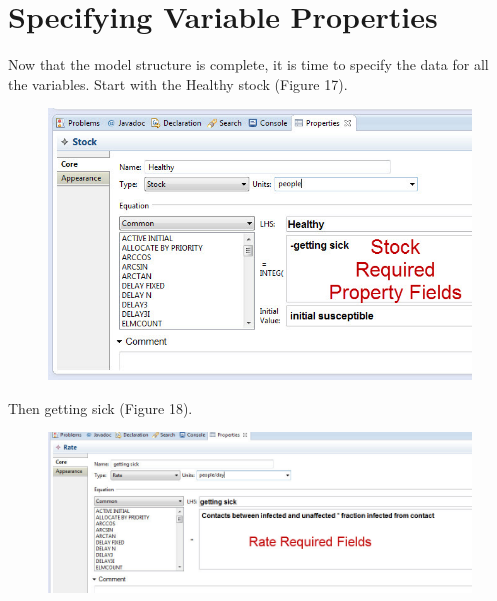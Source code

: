 \documentclass[11pt]{amsart}
\begin{document}
\clearpage


\section{Specifying Variable Properties}
Now that the model structure is complete, it is time to specify the data for all the variables. Start with the Healthy stock (Figure 17).



\begin{figure}[ht]
\begin{center}
\vspace{.2in}
\centerline {
\includegraphics[totalheight=0.3\textheight]{images/017.jpg}
}
\caption{}
\label{fig:017}
\end{center}
\end{figure}

Then getting sick (Figure 18).


\begin{figure}[ht]
\begin{center}
\vspace{.2in}
\centerline {
\includegraphics[totalheight=0.3\textheight]{images/018.jpg}
}
\caption{}
\label{fig:018}
\end{center}
\end{figure}
\end{document}
